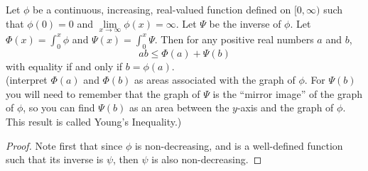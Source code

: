 \begin{pblm} \label{p:129} %
	Let $\phi$ be a continuous, increasing, real-valued function defined on $[0,\infty)$ 
	such that $\phi(0) = 0$ and $\lim\limits_{x\to\infty}\phi(x) = \infty$. Let 
	$\varPsi$ be the inverse of $\phi$. Let 
	$\Phi(x) = \int_0^x\phi$ and $\Psi(x) = \int_0^x\varPsi$. Then for any positive real 
	numbers $a$ and $b$, 
	\begin{equation*}
		ab \le \Phi(a) + \Psi(b)
	\end{equation*}
	with equality if and only if $b = \phi(a)$. \\
	{\scriptsize{(interpret $\Phi(a)$ and $\Phi(b)$ as areas associated with the graph of 
	$\phi$. For $\Psi(b)$ you will need to remember that the graph of $\varPsi$ is the 
	``mirror image'' of the graph of $\phi$, so you can find $\Psi(b)$ as an area between 
	the $y$-axis and the graph of $\phi$. This result is called Young's Inequality.)}}
\begin{proof}
	Note first that since $\phi$ is non-decreasing, and is a well-defined function such 
	that its inverse is $\psi$, then $\psi$ is also non-decreasing. 


\end{proof}
\end{pblm}
